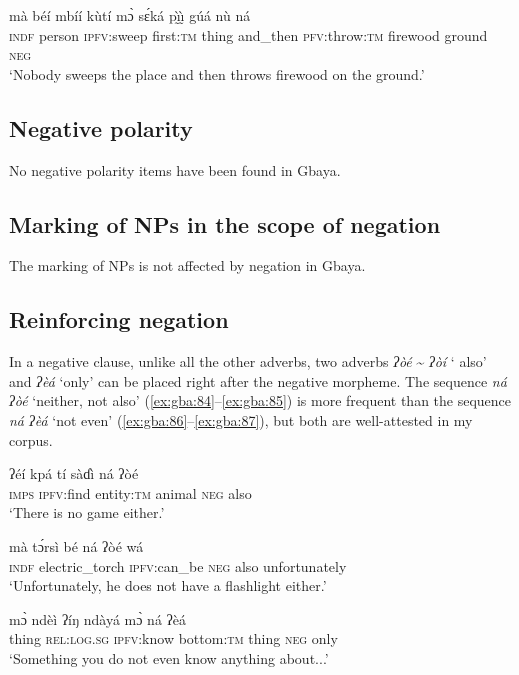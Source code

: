 \documentclass[output=paper,colorlinks=true, citecolor=brown]{langscibook}
\begin{document}
\ea\label{ex:gba:83}
    \gll mà béí mbíí kùtí mɔ̀ sɛ́ká pı̰̀ı̰̀   gúá nù ná \\ 
         \textsc{indf} person \textsc{ipfv}:sweep first:\textsc{tm} thing and\_then \textsc{pfv}:throw:\textsc{tm} firewood ground \textsc{neg} \\
    \glt ‘Nobody sweeps the place and then throws firewood on the ground.’ 
\z 
 
\subsection{Negative polarity}\label{sec:gba:4.2}

No negative polarity items have been found in Gbaya.

\subsection{Marking of NPs in the scope of negation}\label{sec:gba:4.3}

The marking of NPs is not affected by negation in Gbaya.

\subsection{Reinforcing negation}\label{sec:gba:4.4}

In a negative clause, unlike all the other adverbs, two adverbs \textit{ʔòé} {\textasciitilde} \textit{ʔòí} ‘ also’ and \textit{ʔèá} ‘only’ can be placed right after the negative morpheme. The sequence \textit{ná ʔòé} ‘neither, not also’ (\ref{ex:gba:84}--\ref{ex:gba:85}) is more frequent than the sequence \textit{ná ʔèá} ‘not even’ (\ref{ex:gba:86}--\ref{ex:gba:87}), but both are well-attested in my corpus.

\ea\label{ex:gba:84}
    \gll ʔéí kpá tí sàɗì ná ʔòé \\ 
         \textsc{imps} \textsc{ipfv}:find entity:\textsc{tm} animal \textsc{neg} also \\
    \glt ‘There is no game either.’
\z 

\ea\label{ex:gba:85}
    \gll mà tɔ́rsì bé ná ʔòé wá \\ 
         \textsc{indf} electric\_torch \textsc{ipfv}:can\_be \textsc{neg} also unfortunately \\
    \glt ‘Unfortunately, he does not have a flashlight either.’
\z 

\ea\label{ex:gba:86}
    \gll mɔ̀ ndèì ʔíŋ ndàyá mɔ̀ ná ʔèá \\ 
         thing \textsc{rel:log.sg} \textsc{ipfv}:know bottom:\textsc{tm} thing \textsc{neg} only \\
    \glt ‘Something you do not even know anything about...’
\z 
 
\end{document}

